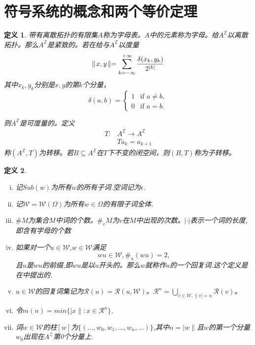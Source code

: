 \documentclass[a4paper,11pt,oneside]{book}
\newtheorem{definition}{\textbf{\hspace{0.7cm}定义}}[section]
\begin{document}
\section{符号系统的概念和两个等价定理}
\begin{definition}
带有离散拓扑的有限集$A$称为字母表。$A$中的元素称为字母。给$A^{\mathbb{Z}}$以离散拓扑。那么$A^{\mathbb{Z}}$是紧致的。若在给与$A^{\mathbb{Z}}$以度量$$\parallel\! x,y\!\parallel =\sum_{k=-\infty}^{+\infty}{\delta (x_k,y_k)\over 2^{|k|}}$$
其中$x_k,y_k$分别是$x,y$的第$k$个分量，
\begin{equation*}
\delta(a,b)=
\begin{cases}
1 &\text{if }a\neq b,\\
0 &\text{if }a=b.
\end{cases}
\end{equation*}

则$A^{\mathbb{Z}}$是可度量的。定义
\begin{align*}
T:& A^{\mathbb{Z}}\rightarrow A^{\mathbb{Z}}\\
  & Ta_k=a_{k+1}
\end{align*}
称$(A^{\mathbb{Z}},T)$为转移。若$B\subseteq A^{\mathbb{Z}}$在$T$下不变的闭空间，则$(B,T)$称为子转移。

\end{definition}


\begin{definition}
\begin{enumerate}[(i)]
\item 记$Sub(w)$为所有$w$的所有子词.空词记为$\epsilon$.
\item 记$\mathcal{W}=\mathcal{W}(\Omega)$为所有$w\in \Omega$的有限子词全体.
\item $\#M$为集合$M$中词的个数。$\#_vM$为$v$在$M$中出现的次数。$|\cdot|$表示一个词的长度,即含有字母的个数
\item 如果对一个$u\in \mathcal{W}$,$w\in \mathcal{W}$满足%
$$w u\in \mathcal{W},\#_u(w u)=2,$$
且$u$是$wu$的前缀,即$wu$是以$u$开头的。那么$w$就称作$u$的一个回复词.这个定义是在\cite{d}中提出的.
\item $u\in \mathcal{W}$的回复词集记为$\mathcal{R}(u)=\mathcal{R}(u,\mathcal{W})$。$\mathcal{R}^n=\bigcup_{v\in \mathcal{W},\|v|=n}\mathcal{R}(v)$。
\item 令$m(n)=min\{|x\|:x\in \mathcal{R}^n\}$.
\item 词$w\in \mathcal{W}$的柱$[w]$为$\{(\ldots,w_0,w_1,\ldots,w_n,\ldots)\}$,其中$n=|w\|$且$w$的第一个分量$w_0$出现在$A^{\mathcal{Z}}$第0个分量上.
\end{enumerate}

\end{definition}
\end{document}
